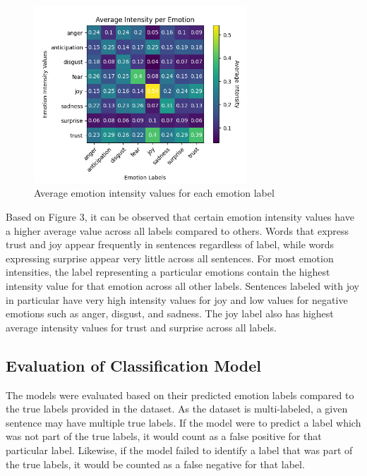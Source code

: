 \documentclass[journal]{./IEEE/IEEEtran}
\begin{document}
\begin{figure}[h!]
    \centering
    \includegraphics[width=8cm]{./images/avgint2.png}
    \caption{Average emotion intensity values for each emotion label}
    \label{fig:chart}
\end{figure}

Based on Figure 3, it can be observed that certain emotion intensity values have a higher average value across all labels compared to others. Words that express trust and joy appear frequently in sentences regardless of label, while words expressing surprise appear very little across all sentences. For most emotion intensities, the label representing a particular emotions contain the highest intensity value for that emotion across all other labels. Sentences labeled with joy in particular have very high intensity values for joy and low values for negative emotions such as anger, disgust, and sadness. The joy label also has highest average intensity values for trust and surprise across all labels.

\subsection{Evaluation of Classification Model}
The models were evaluated based on their predicted emotion labels compared to the true labels provided in the dataset. As the dataset is multi-labeled, a given sentence may have multiple true labels. If the model were to predict a label which was not part of the true labels, it would count as a false positive for that particular label. Likewise, if the model failed to identify a label that was part of the true labels, it would be counted as a false negative for that label.
\end{document}
